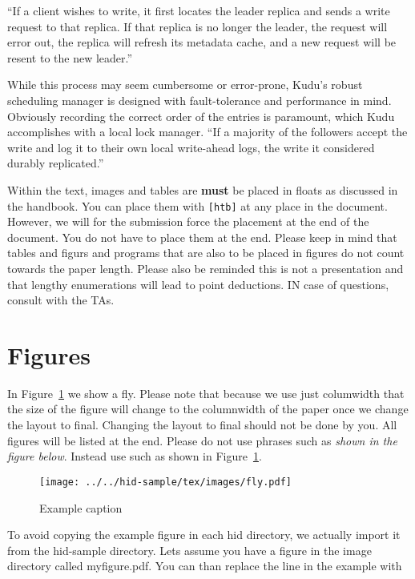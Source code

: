 ``If a client wishes to write, it first locates the leader replica
and sends a write request to that replica. If that replica is no
longer the leader, the request will error out, the replica will
refresh its metadata cache, and a new request will be resent to the
new leader.'' ~\cite{hid-sp18-407-kudu-intro}

While this process may seem cumbersome or error-prone, Kudu's robust
scheduling manager is designed with fault-tolerance and performance
in mind. Obviously recording the correct order of the entries is
paramount, which Kudu accomplishes with a local lock manager.  ``If a
majority of the followers accept the write and log it to their own
local write-ahead logs, the write it considered durably replicated.'' ~\cite{hid-sp18-407-kudu-intro}



Within the text, images and tables are {\bf must} be placed in floats
as discussed in the handbook. You can place them with \verb|[htb]| at
any place in the document. However, we will for the submission force
the placement at the end of the document. You do not have to place
them at the end. Please keep in mind that tables and figurs and
programs that are also to be placed in figures do not count towards
the paper length. Please also be reminded this is not a presentation
and that lengthy enumerations will lead to point deductions. IN case
of questions, consult with the TAs.

\section{Figures}

In Figure~\ref{f:fly} we show a fly. Please note that because we use
just columwidth that the size of the figure will change to the
columnwidth of the paper once we change the layout to final. Changing
the layout to final should not be done by you. All figures will be
listed at the end.  Please do not use phrases such as \textit{shown in
  the figure below}. Instead use such as shown in Figure~\ref{f:fly}.

\begin{figure}[!ht]
  \centering\texttt{[image: ../../hid-sample/tex/images/fly.pdf]}
  \caption{Example caption}\label{f:fly}
\end{figure}

To avoid copying the example figure in each hid directory, we actually
import it from the hid-sample directory. Lets assume you have a figure
in the image directory called myfigure.pdf. You can than replace the
line in the example with

